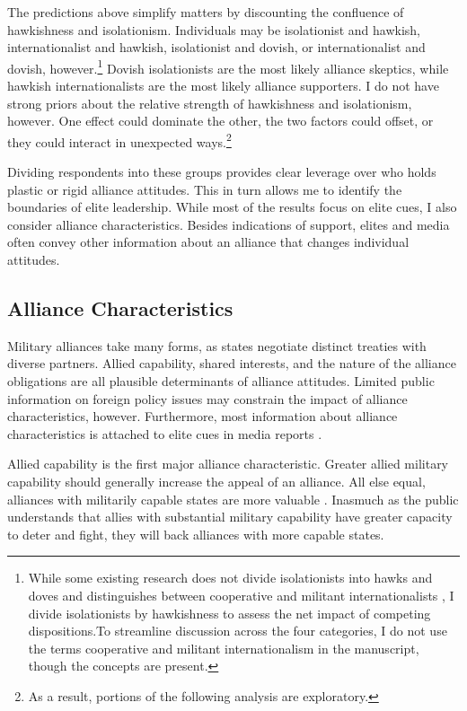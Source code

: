 \documentclass[12pt]{article}
\begin{document}
The predictions above simplify matters by discounting the confluence of hawkishness and isolationism. 
Individuals may be isolationist and hawkish, internationalist and hawkish, isolationist and dovish, or internationalist and dovish, however.\footnote{While some existing research does not divide isolationists into hawks and doves and distinguishes between cooperative and militant internationalists \citep{Kertzeretal2014}, I divide isolationists by hawkishness to assess the net impact of competing dispositions.To streamline discussion across the four categories, I do not use the terms cooperative and militant internationalism in the manuscript, though the concepts are present.}  
Dovish isolationists are the most likely alliance skeptics, while hawkish internationalists are the most likely alliance supporters. 
I do not have strong priors about the relative strength of hawkishness and isolationism, however.
One effect could dominate the other, the two factors could offset, or they could interact in unexpected ways.\footnote{As a result, portions of the following analysis are exploratory.}


Dividing respondents into these groups provides clear leverage over who holds plastic or rigid alliance attitudes. 
This in turn allows me to identify the boundaries of elite leadership. 
While most of the results focus on elite cues, I also consider alliance characteristics. 
Besides indications of support, elites and media often convey other information about an alliance that changes individual attitudes.  



\subsection{Alliance Characteristics}


Military alliances take many forms, as states negotiate distinct treaties with diverse partners.
Allied capability, shared interests, and the nature of the alliance obligations are all plausible determinants of alliance attitudes.   
Limited public information on foreign policy issues may constrain the impact of alliance characteristics, however. 
Furthermore, most information about alliance characteristics is attached to elite cues in media reports \citep{BaumPotter2008}. 


Allied capability is the first major alliance characteristic.
Greater allied military capability should generally increase the appeal of an alliance. 
All else equal, alliances with militarily capable states are more valuable \citep{Johnsonetal2015}. 
Inasmuch as the public understands that allies with substantial military capability have greater capacity to deter and fight, they will back alliances with more capable states. 
\end{document}
